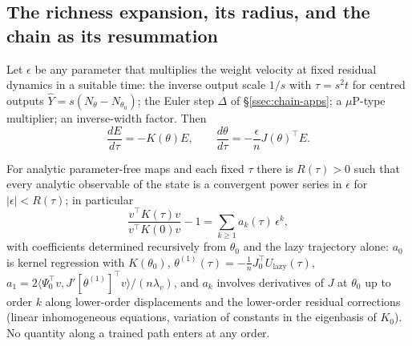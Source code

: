 \subsection{The richness expansion, its radius, and the chain as its resummation}
\label{ssec:chain-richness}

Let $\epsilon$ be any parameter that multiplies the weight velocity at fixed
residual dynamics in a suitable time: the inverse output scale $1/s$ with
$\tau=s^2t$ for centred outputs $\hat Y=s(N_\theta-N_{\theta_0})$; the Euler step
$\Delta$ of \S\ref{ssec:chain-apps}; a $\mu$P-type multiplier; an inverse-width
factor. Then
\[
\frac{dE}{d\tau}=-K(\theta)E,\qquad\frac{d\theta}{d\tau}=-\frac{\epsilon}{n}J(\theta)^{\!\top}E .
\]

\begin{theorem}
\label{thm:richness}
For analytic parameter-free maps and each fixed $\tau$ there is $R(\tau)>0$ such
that every analytic observable of the state is a convergent power series in
$\epsilon$ for $|\epsilon|<R(\tau)$; in particular
\[
\frac{v^{\!\top}K(\tau)v}{v^{\!\top}K(0)v}-1=\sum_{k\ge1}a_k(\tau)\,\epsilon^k ,
\]
with coefficients determined recursively from $\theta_0$ and the lazy
trajectory alone: $a_0$ is kernel regression with $K(\theta_0)$,
$\theta^{(1)}(\tau)=-\frac1nJ_0^{\!\top}U_{\mathrm{lazy}}(\tau)$,
$a_1=2\langle\Psi_0^{\!\top}v,J'[\theta^{(1)}]^{\!\top}v\rangle/(n\lambda_v)$, and $a_k$
involves derivatives of $J$ at $\theta_0$ up to order $k$ along lower-order
displacements and the lower-order residual corrections (linear inhomogeneous
equations, variation of constants in the eigenbasis of $K_0$). No quantity along
a trained path enters at any order.
\end{theorem}

